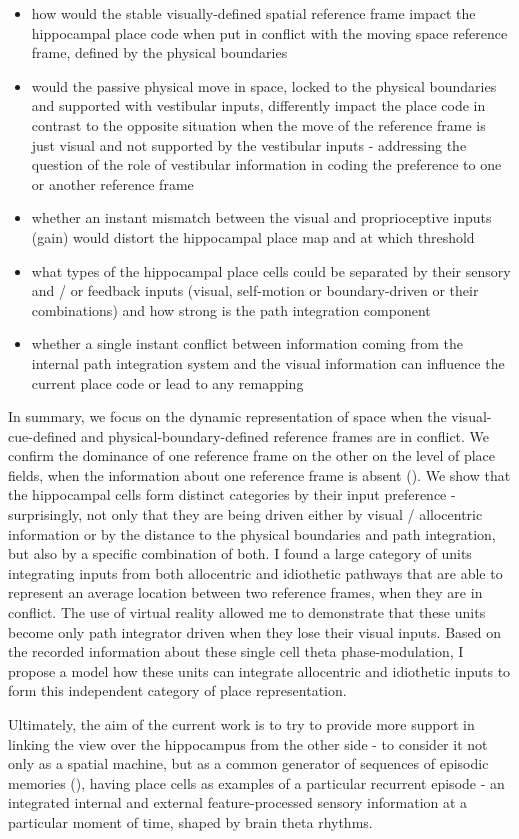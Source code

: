 \begin{itemize}
  \item how would the stable visually-defined spatial reference frame impact the hippocampal place code when put in conflict with the moving space reference frame, defined by the physical boundaries
  \item would the passive physical move in space, locked to the physical boundaries and supported with vestibular inputs, differently impact the place code in contrast to the opposite situation when the move of the reference frame is just visual and not supported by the vestibular inputs - addressing the question of the role of vestibular information in coding the preference to one or another reference frame
	\item whether an instant mismatch between the visual and proprioceptive inputs (gain) would distort the hippocampal place map and at which threshold
	\item what types of the hippocampal place cells could be separated by their sensory and / or feedback inputs (visual, self-motion or boundary-driven or their combinations) and how strong is the path integration component
	\item whether a single instant conflict between information coming from the internal path integration system and the visual information can influence the current place code or lead to any remapping
\end{itemize}

In summary, we focus on the dynamic representation of space when the visual-cue-defined and physical-boundary-defined reference frames are in conflict. We confirm the dominance of one reference frame on the other on the level of place fields, when the information about one reference frame is absent (\cite{Gothard2001}). We show that the hippocampal cells form distinct categories by their input preference - surprisingly, not only that they are being driven either by visual / allocentric information or by the distance to the physical boundaries and path integration, but also by a specific combination of both. I found a large category of units integrating inputs from both allocentric and idiothetic pathways that are able to represent an average location between two reference frames, when they are in conflict. The use of virtual reality allowed me to demonstrate that these units become only path integrator driven when they lose their visual inputs. Based on the recorded information about these single cell theta phase-modulation, I propose a model how these units can integrate allocentric and idiothetic inputs to form this independent category of place representation.

Ultimately, the aim of the current work is to try to provide more support in linking the view over the hippocampus from the other side - to consider it not only as a spatial machine, but as a common generator of sequences of episodic memories (\cite{Buzsaki2013}), having place cells as examples of a particular recurrent episode - an integrated internal and external feature-processed sensory information at a particular moment of time, shaped by brain theta rhythms.
